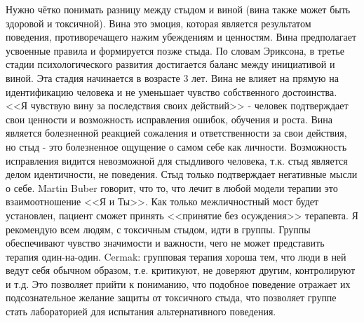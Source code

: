 \documentclass[10pt, fleqn]{article}
\begin{document}
Нужно чётко понимать разницу между стыдом и виной (вина также может быть здоровой и токсичной). Вина это эмоция, которая является результатом поведения, противоречащего нажим убеждениям и ценностям. Вина предполагает усвоенные правила и формируется позже стыда. По словам Эриксона, в третье стадии психологического развития достигается баланс между инициативой и виной. Эта стадия начинается в возрасте 3 лет.
Вина не влияет на прямую на идентификацию человека и не уменьшает чувство собственного достоинства.
<<Я чувствую вину за последствия своих действий>> - человек подтверждает свои ценности и возможность исправления ошибок, обучения и роста. Вина является болезненной реакцией сожаления и ответственности за свои действия, но стыд - это болезненное ощущение о самом себе как личности. Возможность исправления видится невозможной для стыдливого человека, т.к. стыд является делом идентичности, не поведения. Стыд только подтверждает негативные мысли о себе.
Martin Buber говорит, что то, что лечит в любой модели терапии это взаимоотношение <<Я и Ты>>. Как только межличностный мост будет установлен, пациент сможет принять <<принятие без осуждения>> терапевта.
Я рекомендую всем людям, с токсичным стыдом, идти в группы. Группы обеспечивают чувство значимости и важности, чего не может представить терапия один-на-один.
Cermak: групповая терапия хороша тем, что люди в ней ведут себя обычном образом, т.е. критикуют, не доверяют другим, контролируют и т.д. Это позволяет прийти к пониманию, что подобное поведение отражает их подсознательное желание защиты от токсичного стыда, что позволяет группе стать лабораторией для испытания альтернативного поведения.

\end{document}
